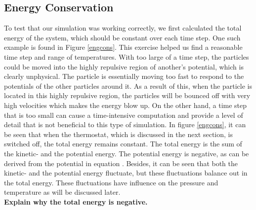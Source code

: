 \documentclass{article}
\begin{document}
\begin{multicols}{2}
\subsection{Energy Conservation}

To test that our simulation was working correctly, we first calculated the total energy of the system, which should be constant over each time step.  One such example is found in Figure \ref{engcons}.  This exercise helped us find a reasonable time step and range of temperatures.  With too large of a time step, the particles could be moved into the highly repulsive region of another's potential, which is clearly unphysical. The particle is essentially moving too fast to respond to the potentials of the other particles around it. As a result of this, when the particle is located in this highly repulsive region, the particles will be bounced off with very high velocities which makes the energy blow up. On the other hand, a time step that is too small can cause a time-intensive computation and provide a level of detail that is not beneficial to this type of simulation. In figure \ref{engcons}, it can be seen that when the thermostat, which is discussed in the next section, is switched off, the total energy remains constant. The total energy is the sum of the kinetic- and the potential energy. The potential energy is negative, as can be derived from the potential in equation \label{LJpot}. Besides, it can be seen that both the kinetic- and the potential energy fluctuate, but these fluctuations balance out in the total energy. These fluctuations have influence on the pressure and temperature as will be discussed later.\\

\textbf{Explain why the total energy is negative.}\\


\end{multicols}
\end{document}
